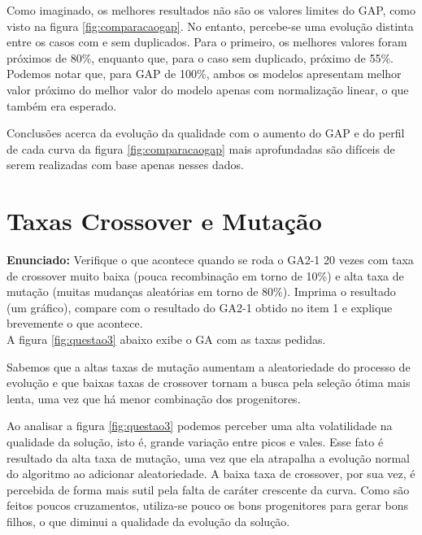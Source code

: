 \documentclass[12pt]{article}
\begin{document}
Como imaginado, os melhores resultados não são os valores limites do GAP, como visto na figura \ref{fig:comparacaogap}. No entanto, percebe-se uma evolução distinta entre os casos com e sem duplicados. Para o primeiro, os melhores valores foram próximos de 80\%, enquanto que, para o caso sem duplicado, próximo de 55\%. Podemos notar que, para GAP de 100\%, ambos os modelos apresentam melhor valor próximo do melhor valor do modelo apenas com normalização linear, o que também era esperado.

Conclusões acerca da evolução da qualidade com o aumento do GAP e do perfil de cada curva da figura \ref{fig:comparacaogap} mais aprofundadas são difíceis de serem realizadas com base apenas nesses dados.
	
\section{Taxas Crossover e Mutação}
\textbf{Enunciado:}
Verifique o que acontece quando se roda o GA2-1 20 vezes com taxa de crossover muito baixa (pouca recombinação em torno de 10\%) e alta taxa de mutação (muitas mudanças aleatórias em torno de 80\%). Imprima o resultado (um gráfico), compare com o resultado do GA2-1 obtido no item 1 e explique
brevemente o que acontece.\\

A figura \ref{fig:questao3} abaixo exibe o GA com as taxas pedidas.

Sabemos que a altas taxas de mutação aumentam a aleatoriedade do processo de evolução e que baixas taxas de crossover tornam a busca pela seleção ótima mais lenta, uma vez que há menor combinação dos progenitores.

Ao analisar a figura \ref{fig:questao3} podemos perceber uma alta volatilidade na qualidade da solução, isto é, grande variação entre picos e vales. Esse fato é resultado da alta taxa de mutação, uma vez que ela atrapalha a evolução normal do algoritmo ao adicionar aleatoriedade. A baixa taxa de crossover, por sua vez, é percebida de forma mais sutil pela falta de caráter crescente da curva. Como são feitos poucos cruzamentos, utiliza-se pouco os bons progenitores para gerar bons filhos, o que diminui a qualidade da evolução da solução. 
\end{document}
